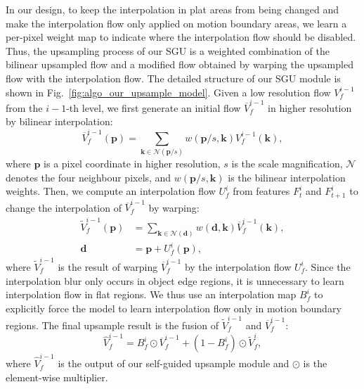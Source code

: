 \documentclass[final]{cvpr}
\begin{document}
In our design, to keep the interpolation in plat areas from being changed and make the interpolation flow only applied on motion boundary areas, we learn a per-pixel weight map to indicate where the interpolation flow should be disabled. Thus, the upsampling process of our SGU is a weighted combination of the bilinear upsampled flow and a modified flow obtained by warping the upsampled flow with the interpolation flow. 
The detailed structure of our SGU module is shown in Fig.~\ref{fig:algo_our_upsample_model}. 
Given a low resolution flow $V_{f}^{i-1}$ from the $i-1$-th level, we first generate an initial flow $\overline{V}_{f}^{i-1}$ in higher resolution by bilinear interpolation:
\begin{equation}\label{eq:bilinear_interpolation_upsample}
	\overline{V}_{f}^{i-1}(\bm{p})=\sum_{\bm{k} \in \mathcal{N}(\bm{p}/s)} w(\bm{p}/s, \bm{k}) V_{f}^{i-1}(\bm{k}), 
\end{equation}
where $\bm{p}$ is a pixel coordinate in higher resolution, $s$ is the scale magnification, $\mathcal{N}$ denotes the four neighbour pixels, and $w(\bm{p}/s, \bm{k})$ is the bilinear interpolation weights. 
Then, we compute an interpolation flow $U_{f}^{i}$ from features $F_t^{i}$ and $F_{t+1}^{i}$ to change the interpolation of $\overline{V}_{f}^{i-1}$ by warping: \begin{align}
	\widetilde{V}_{f}^{i-1}(\bm{p}) &= \sum_{\bm{k} \in \mathcal{N}(\bm{d})} w(\bm{d},\bm{k} ) \overline{V}_{f}^{i-1}(\bm{k}), \label{eq:guided_interpolation_upsample} \\
	\bm{d} &= \bm{p}+U_{f}^{i}(\bm{p}), \label{eq:guided_interpolation_upsample_}
\end{align}
where $\widetilde{V}_{f}^{i-1}$ is the result of warping $\overline{V}_{f}^{i-1}$ by the interpolation flow $U_{f}^{i}$. Since the interpolation blur only occurs in object edge regions, it is unnecessary to learn interpolation flow in flat regions. We thus use an interpolation map $B_{f}^{i}$ to explicitly force the model to learn interpolation flow only in motion boundary regions. The final upsample result is the fusion of $\widetilde{V}_{f}^{i-1}$ and $\overline{V}_{f}^{i-1}$:
\begin{equation}\label{eq:guided_interpolation_upsample_fusion}
	\hat{V}_{f}^{i-1}=B_{f}^{i}\odot \overline{V}_{f}^{i-1}+(1-B_{f}^{i})\odot \widetilde{V}_{f}^{i}, 
\end{equation}
where $\hat{V}_{f}^{i-1}$ is the output of our self-guided upsample module and $\odot$ is the element-wise multiplier. 
\end{document}
